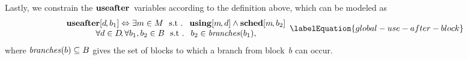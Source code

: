 Lastly, we constrain the $\mVar{useafter}$~\glspl{variable} according to the
definition above, which can be modeled as
%
\begin{equation}
  \begin{array}{c}
    \mVar{useafter}[d \hspace{-1pt}, b_1]
    \mEq
    \exists m \in \mMatchSet
    \text{ \st }
    \mVar{using}[m \hspace{-1pt}, d]
    \mAnd
    \mVar{sched}[m \hspace{-1pt}, b_2]
    \\
    \forall d \in \mDataSet \!,
    \forall b_1, b_2 \in \mBlockSet
    \text{ \st }
    b_2 \in \mBranches(b_1),
  \end{array}
  \labelEquation{global-use-after-block}
\end{equation}
%
where \mbox{$\operatorname{\textrm{\textit{branches}}}(b) \subseteq B$} gives the set of \glspl{block}
to which a branch from \gls{block}~$b$ can occur.
